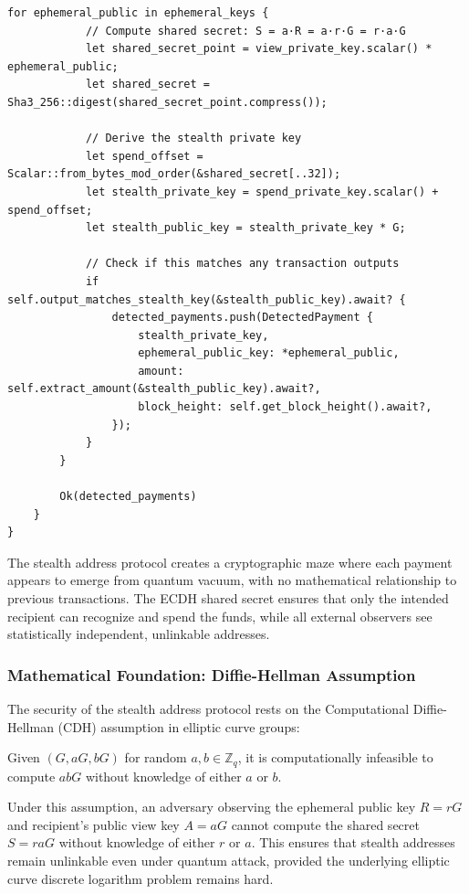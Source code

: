 \documentclass[11pt,a4paper]{article}
\begin{document}
\begin{lstlisting}[caption=Quantum-Enhanced Stealth Address Generation]
        for ephemeral_public in ephemeral_keys {
            // Compute shared secret: S = a·R = a·r·G = r·a·G
            let shared_secret_point = view_private_key.scalar() * ephemeral_public;
            let shared_secret = Sha3_256::digest(shared_secret_point.compress());
            
            // Derive the stealth private key
            let spend_offset = Scalar::from_bytes_mod_order(&shared_secret[..32]);
            let stealth_private_key = spend_private_key.scalar() + spend_offset;
            let stealth_public_key = stealth_private_key * G;
            
            // Check if this matches any transaction outputs
            if self.output_matches_stealth_key(&stealth_public_key).await? {
                detected_payments.push(DetectedPayment {
                    stealth_private_key,
                    ephemeral_public_key: *ephemeral_public,
                    amount: self.extract_amount(&stealth_public_key).await?,
                    block_height: self.get_block_height().await?,
                });
            }
        }
        
        Ok(detected_payments)
    }
}
\end{lstlisting}

The stealth address protocol creates a cryptographic maze where each payment appears to emerge from quantum vacuum, with no mathematical relationship to previous transactions. The ECDH shared secret ensures that only the intended recipient can recognize and spend the funds, while all external observers see statistically independent, unlinkable addresses.

\subsubsection{Mathematical Foundation: Diffie-Hellman Assumption}

The security of the stealth address protocol rests on the Computational Diffie-Hellman (CDH) assumption in elliptic curve groups:

\begin{definition}
Given $(G, aG, bG)$ for random $a, b \in \mathbb{Z}_q$, it is computationally infeasible to compute $abG$ without knowledge of either $a$ or $b$.
\end{definition}

Under this assumption, an adversary observing the ephemeral public key $R = rG$ and recipient's public view key $A = aG$ cannot compute the shared secret $S = raG$ without knowledge of either $r$ or $a$. This ensures that stealth addresses remain unlinkable even under quantum attack, provided the underlying elliptic curve discrete logarithm problem remains hard.
\end{document}

